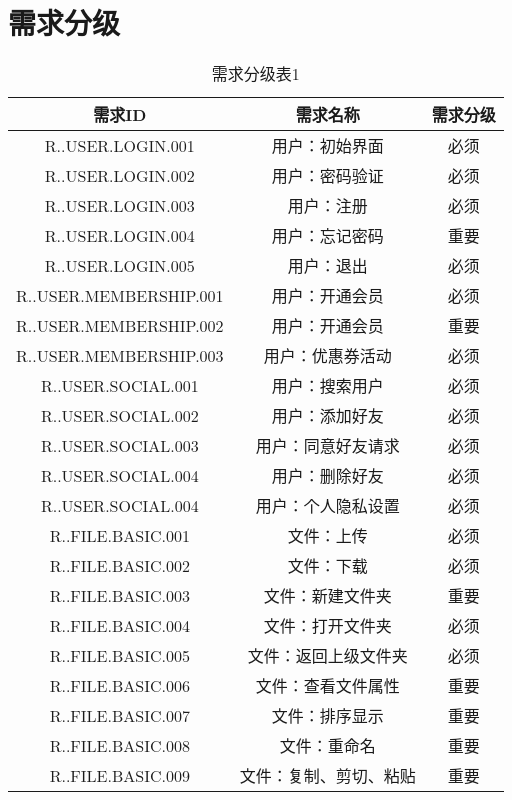 \chapter{需求分级}
\begin{table}[htbp]
    \color{red}
\centering
\caption{需求分级表1} \label{tab:abbr}
\begin{tabular}{|c|c|c|}
    \hline
    需求ID & 需求名称 & 需求分级 \\
    \hline
    R..USER.LOGIN.001 & 用户：初始界面 & 必须 \\
    \hline
    R..USER.LOGIN.002 & 用户：密码验证 & 必须 \\
    \hline 
    R..USER.LOGIN.003 & 用户：注册 & 必须 \\
    \hline
    R..USER.LOGIN.004 & 用户：忘记密码 & 重要 \\
    \hline
    R..USER.LOGIN.005 & 用户：退出 & 必须 \\
    \hline
    R..USER.MEMBERSHIP.001 & 用户：开通会员 & 必须 \\
    \hline
    R..USER.MEMBERSHIP.002 & 用户：开通会员 & 重要 \\
    \hline
    R..USER.MEMBERSHIP.003 & 用户：优惠券活动 & 必须 \\
    \hline
    R..USER.SOCIAL.001 & 用户：搜索用户 & 必须 \\
    \hline
    R..USER.SOCIAL.002 & 用户：添加好友 & 必须 \\
    \hline
    R..USER.SOCIAL.003 & 用户：同意好友请求 & 必须 \\
    \hline
    R..USER.SOCIAL.004 & 用户：删除好友 & 必须 \\
    \hline
    R..USER.SOCIAL.004 & 用户：个人隐私设置 & 必须 \\
    \hline
    R..FILE.BASIC.001 & 文件：上传 & 必须 \\
    \hline
    R..FILE.BASIC.002 & 文件：下载 & 必须 \\
    \hline 
    R..FILE.BASIC.003 & 文件：新建文件夹 & 重要 \\
    \hline
    R..FILE.BASIC.004 & 文件：打开文件夹 & 必须 \\
    \hline
    R..FILE.BASIC.005 & 文件：返回上级文件夹 & 必须 \\
    \hline
    R..FILE.BASIC.006 & 文件：查看文件属性 & 重要 \\
    \hline
    R..FILE.BASIC.007 & 文件：排序显示 & 重要 \\
    \hline
    R..FILE.BASIC.008 & 文件：重命名 & 重要 \\
    \hline
    R..FILE.BASIC.009 & 文件：复制、剪切、粘贴 & 重要 \\

\end{tabular}
\end{table}
